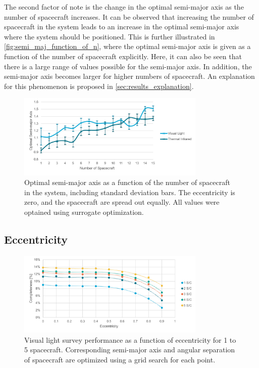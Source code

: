 The second factor of note is the change in the optimal semi-major axis as the number of spacecraft increases. It can be observed that increasing the number of spacecraft in the system leads to an increase in the optimal semi-major axis where the system should be positioned. This is further illustrated in \autoref{fig:semi_maj_function_of_n}, where the optimal semi-major axis is given as a function of the number of spacecraft explicitly. Here, it can also be seen that there is a large range of values possible for the semi-major axis. In addition, the semi-major axis becomes larger for higher numbers of spacecraft. An explanation for this phenomenon is proposed in \autoref{sec:results_explanation}.

\begin{figure}[htbp]
 \centering
 \includegraphics[width=0.8\textwidth]{img/semi_maj_function_of_n.pdf}
 \caption{Optimal semi-major axis as a function of the number of spacecraft in the system, including standard deviation bars. The eccentricity is zero, and the spacecraft are spread out equally. All values were optained using surrogate optimization.}
 \label{fig:semi_maj_function_of_n}
\end{figure}



\subsection{Eccentricity}
\begin{figure}[htbp]
 \centering
 \includegraphics[width=0.8\textwidth]{img/vis_ecc.pdf}
 \caption{Visual light survey performance as a function of eccentricity for 1 to 5 spacecraft. Corresponding semi-major axis and angular separation of spacecraft are optimized using a grid search for each point.}
 \label{fig:vis_ecc}
\end{figure}

